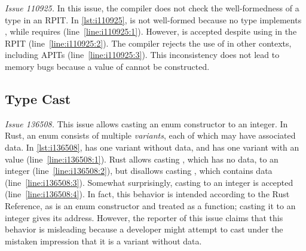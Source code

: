 {\it Issue 110925.}
%
In this issue, the compiler does not check the well-formedness of a type in an
RPIT.
%
In \cref{lst:i110925},  is not well-formed because no type implements
, while  requires  (line~\ref{line:i110925:1}).
%
However,  is accepted despite using  in the RPIT
(line~\ref{line:i110925:2}).
%
The compiler rejects the use of  in other contexts, including APITs
(line~\ref{line:i110925:3}).
%
This inconsistency does not lead to memory bugs because a value of 
cannot be constructed.

\subsection{Type Cast}

{\it Issue 136508.}
%
This issue allows casting an enum constructor to an integer.
%
In Rust, an enum consists of multiple \emph{variants}, each of which may have
associated data.
%
In \cref{lst:i136508},  has one variant  without data, and  has
one variant  with an  value (line~\ref{line:i136508:1}).
%
Rust allows casting , which has no data, to an integer
(line~\ref{line:i136508:2}), but disallows casting , which contains
data (line~\ref{line:i136508:3}).
%
Somewhat surprisingly, casting  to an integer is accepted
(line~\ref{line:i136508:4}).
%
In fact, this behavior is intended according to the Rust Reference, as 
is an enum constructor and treated as a function;
%
casting it to an integer gives its address.
%
However, the reporter of this issue claims that this behavior is misleading
because a developer might attempt to cast  under the mistaken impression
that it is a variant without data.
